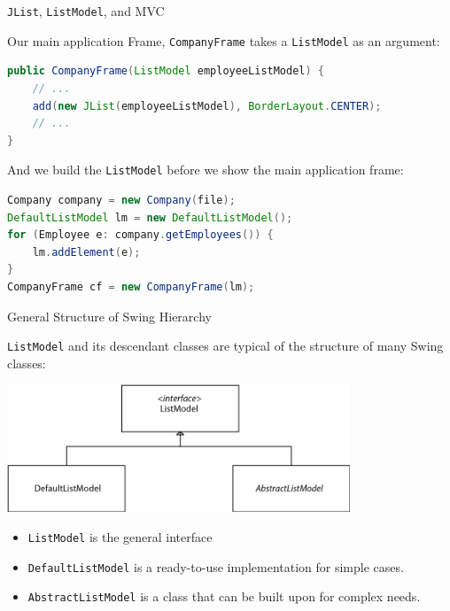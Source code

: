 \documentclass{beamer}
\begin{document}
\begin{frame}[fragile]{{\tt JList}, {\tt ListModel}, and MVC}


Our main application Frame, {\tt CompanyFrame} takes a {\tt ListModel} as an argument:
\begin{lstlisting}[language=Java]
public CompanyFrame(ListModel employeeListModel) {
    // ...
    add(new JList(employeeListModel), BorderLayout.CENTER);
    // ...
}
\end{lstlisting}
And we build the {\tt ListModel} before we show the main application frame:
\begin{lstlisting}[language=Java]
Company company = new Company(file);
DefaultListModel lm = new DefaultListModel();
for (Employee e: company.getEmployees()) {
    lm.addElement(e);
}
CompanyFrame cf = new CompanyFrame(lm);  
\end{lstlisting}


\end{frame}

\begin{frame}[fragile]{General Structure of Swing Hierarchy}


{\tt ListModel} and its descendant classes are typical of the structure of many Swing classes:
\begin{center}
\includegraphics[height=1.5in]{list-model-hierarchy.png}
\end{center}

\begin{itemize}
\item {\tt ListModel} is the general interface
\item {\tt DefaultListModel} is a ready-to-use implementation for simple cases.
\item {\tt AbstractListModel} is a class that can be built upon for complex needs.
\end{itemize}


\end{frame}
\end{document}
